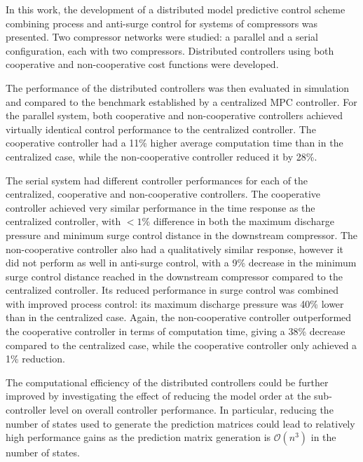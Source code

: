 \label{sec:conclusion}

In this work, the development of a distributed model predictive control scheme combining process and anti-surge control for systems of compressors was presented.
Two compressor networks were studied: a parallel and a serial configuration, each with two compressors.
Distributed controllers using both cooperative and non-cooperative cost functions were developed.

The performance of the distributed controllers was then evaluated in simulation and compared to the benchmark established by a centralized MPC controller.
For the parallel system, both cooperative and non-cooperative controllers achieved virtually identical control performance to the centralized controller.
The cooperative controller had a 11\% higher average computation time than in the centralized case, while the non-cooperative controller reduced it by 28\%.

The serial system had different controller performances for each of the centralized, cooperative and non-cooperative controllers.
The cooperative controller achieved very similar performance in the time response as the centralized controller, with $<1\%$ difference in both the maximum discharge pressure and minimum surge control distance in the downstream compressor.
The non-cooperative controller also had a qualitatively similar response, however it did not perform as well in anti-surge control, with a 9\% decrease in the minimum surge control distance reached in the downstream compressor compared to the centralized controller.
Its reduced performance in surge control was combined with improved process control: its maximum discharge pressure was 40\% lower than in the centralized case.
Again, the non-cooperative controller outperformed the cooperative controller in terms of computation time, giving a 38\% decrease compared to the centralized case, while the cooperative controller only achieved a 1\% reduction.  

The computational efficiency of the distributed controllers could be further improved by investigating the effect of reducing the model order at the sub-controller level on overall controller performance.
In particular, reducing the number of states used to generate the prediction matrices could lead to relatively high performance gains as the prediction matrix generation is $\mathcal{O}(n^3)$ in the number of states.

